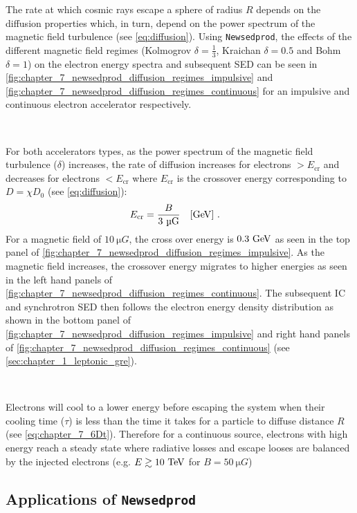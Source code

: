 The rate at which cosmic rays escape a sphere of radius $R$ depends on the diffusion properties which, in turn, depend on the power spectrum of the magnetic field turbulence (see \autoref{eq:diffusion}). Using {\tt Newsedprod}, the effects of the different magnetic field regimes (Kolmogrov $\delta=\frac{1}{3}$, Kraichan $\delta=0.5$ and Bohm $\delta=1$) on the electron energy spectra and subsequent SED can be seen in \autoref{fig:chapter_7_newsedprod_diffusion_regimes_impulsive} and \autoref{fig:chapter_7_newsedprod_diffusion_regimes_continuous} for an impulsive and continuous electron accelerator respectively.
\par~\par 
For both accelerators types, as the power spectrum of the magnetic field turbulence ($\delta$) increases, the rate of diffusion increases for electrons $>E_\text{cr}$ and decreases for electrons $<E_\text{cr}$ where $E_\text{cr}$ is the crossover energy corresponding to $D=\chi D_0$ (see \autoref{eq:diffusion}):
\begin{equation}
    \begin{aligned}
        E_\text{cr}&=\frac{B}{3~\si{\micro G}}\quad\qty[\GeV]\text{ .}
    \end{aligned}
\end{equation}
\noindent For a magnetic field of $10~\si{\micro G}$, the cross over energy is $0.3~\GeV$ as seen in the top panel of \autoref{fig:chapter_7_newsedprod_diffusion_regimes_impulsive}. As the magnetic field increases, the crossover energy migrates to higher energies as seen in the left hand panels of \autoref{fig:chapter_7_newsedprod_diffusion_regimes_continuous}. The subsequent IC and synchrotron SED then follows the electron energy density distribution as shown in the bottom panel of \autoref{fig:chapter_7_newsedprod_diffusion_regimes_impulsive} and right hand panels of \autoref{fig:chapter_7_newsedprod_diffusion_regimes_continuous} (see \autoref{sec:chapter_1_leptonic_gre}).
\par~\par 
Electrons will cool to a lower energy before escaping the system when their cooling time ($\tau$) is less than the time it takes for a particle to diffuse distance $R$ (see \autoref{eq:chapter_7_6Dt}). Therefore for a continuous source, electrons with high energy reach a steady state where radiative losses and escape looses are balanced by the injected electrons (e.g. $E\gtrsim 10~\TeV$ for $B=50~\si{\micro G}$)

\subsection{Applications of {\tt Newsedprod}}

